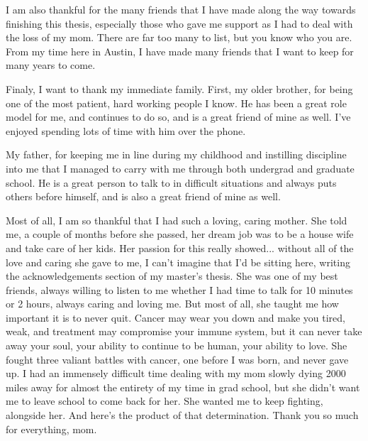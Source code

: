 \documentclass[12pt]{report}	%
\begin{document}
\begin{acknowledgments}
I am also thankful for the many friends that I have made along the way towards finishing this thesis, especially those who gave me support as I had to deal with the loss of my mom. There are far too many to list, but you know who you are. From my time here in Austin, I have made many friends that I want to keep for many years to come. \par
Finaly, I want to thank my immediate family. First, my older brother, for being one of the most patient, hard working people I know. He has been a great role model for me, and continues to do so, and is a great friend of mine as well. I've enjoyed spending lots of time with him over the phone. \par 
My father, for keeping me in line during my childhood and instilling discipline into me that I managed to carry with me through both undergrad and graduate school. He is a great person to talk to in difficult situations and always puts others before himself, and is also a great friend of mine as well.\par
Most of all, I am so thankful that I had such a loving, caring mother. She told me, a couple of months before she passed, her dream job was to be a house wife and take care of her kids. Her passion for this really showed... without all of the love and caring she gave to me, I can't imagine that I'd be sitting here, writing the acknowledgements section of my master's thesis. She was one of my best friends, always willing to listen to me whether I had time to talk for 10 minutes or 2 hours, always caring and loving me. But most of all, she taught me how important it is to never quit. Cancer may wear you down and make you tired, weak, and treatment may compromise your immune system, but it can never take away your soul, your ability to continue to be human, your ability to love. She fought three valiant battles with cancer, one before I was born, and never gave up. I had an immensely difficult time dealing with my mom slowly dying 2000 miles away for almost the entirety of my time in grad school, but she didn't want me to leave school to come back for her. She wanted me to keep fighting, alongside her. And here's the product of that determination. Thank you so much for everything, mom. 
\end{acknowledgments}
\end{document}
